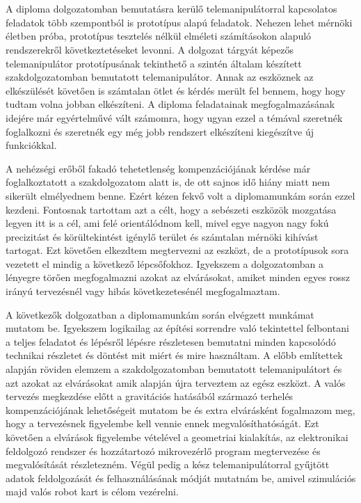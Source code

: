 \chapter{\bevezetes}

A diploma dolgozatomban bemutatásra kerülő telemanipulátorral kapcsolatos feladatok több szempontból is prototípus alapú feladatok. Nehezen lehet mérnöki életben próba, prototípus tesztelés nélkül elméleti számításokon alapuló rendszerekről következtetéseket levonni. A dolgozat tárgyát képezős telemanipulátor prototípusának tekinthető a szintén általam készített szakdolgozatomban bemutatott telemanipulátor. Annak az eszköznek az elkészülését követően is számtalan ötlet és kérdés merült fel bennem, hogy hogy tudtam volna jobban elkészíteni. A diploma feladatainak megfogalmazásának  idejére már egyértelművé vált számomra, hogy ugyan ezzel a témával szeretnék foglalkozni és szeretnék egy még jobb rendszert elkészíteni kiegészítve új funkciókkal.

A nehézségi erőből fakadó tehetetlenség kompenzációjának kérdése már foglalkoztatott a szakdolgozatom alatt is, de ott sajnos idő hiány miatt nem sikerült elmélyednem benne. Ezért kézen fekvő volt a diplomamunkám során ezzel kezdeni. Fontosnak tartottam azt a célt, hogy a sebészeti eszközök mozgatása legyen itt is a cél, ami felé orientálódnom kell, mivel egye nagyon nagy fokú precizitást és körültekintést igénylő terület és számtalan mérnöki kihívást tartogat. Ezt követően elkezdtem megtervezni az eszközt, de a prototípusok sora vezetett el mindig a következő lépcsőfokhoz. Igyekszem a dolgozatomban a lényegre törően megfogalmazni azokat az elvárásokat, amiket minden egyes rossz irányú tervezésnél vagy hibás következetesénél megfogalmaztam.

A következők dolgozatban a diplomamunkám során elvégzett munkámat mutatom be. Igyekszem logikailag az építési sorrendre való tekintettel felbontani a teljes feladatot és lépésről lépésre részletesen bemutatni minden kapcsolódó technikai részletet és döntést mit miért és mire használtam. A előbb említettek alapján röviden elemzem a szakdolgozatomban bemutatott telemanipulátort és azt azokat az elvárásokat amik alapján újra terveztem az egész eszközt. A valós tervezés megkezdése előtt a gravitációs hatásából származó terhelés kompenzációjának lehetőségeit mutatom be és extra elvárásként fogalmazom meg, hogy a tervezésnek figyelembe kell vennie ennek megvalósíthatóságát. Ezt követően a elvárások figyelembe vételével a geometriai kialakítás, az elektronikai feldolgozó rendszer és hozzátartozó mikrovezérlő program megtervezése és megvalósítását részletezném. Végül pedig a kész telemanipulátorral gyűjtött adatok feldolgozását és felhasználásának módját mutatnám be, amivel szimulációs majd valós robot kart is célom vezérelni.